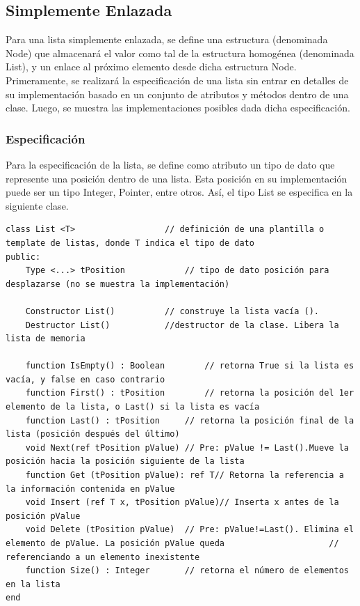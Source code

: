 \subsection{Simplemente Enlazada}
Para una lista simplemente enlazada, se define una estructura (denominada Node) que almacenará el valor como tal de la estructura homogénea (denominada List), y un enlace al próximo elemento desde dicha estructura Node. Primeramente, se realizará la especificación de una lista sin entrar en detalles de su implementación basado en un conjunto de atributos y métodos dentro de una clase. Luego, se muestra las implementaciones posibles dada dicha especificación.

\subsubsection{Especificación}

Para la especificación de la lista, se define como atributo un tipo de dato que represente una posición dentro de una lista. Esta posición en su implementación puede ser un tipo Integer, Pointer, entre otros. Así, el tipo List se especifica en la siguiente clase.

\begin{lstlisting}[upquote=true, language=pseudo]
class List <T>					// definición de una plantilla o template de listas, donde T indica el tipo de dato
public:
    Type <...> tPosition			// tipo de dato posición para desplazarse (no se muestra la implementación)

    Constructor List()			// construye la lista vacía ().
    Destructor List()			//destructor de la clase. Libera la lista de memoria

    function IsEmpty() : Boolean		// retorna True si la lista es vacía, y false en caso contrario
    function First() : tPosition		// retorna la posición del 1er elemento de la lista, o Last() si la lista es vacía
    function Last() : tPosition		// retorna la posición final de la lista (posición después del último)
    void Next(ref tPosition pValue)	// Pre: pValue != Last().Mueve la posición hacia la posición siguiente de la lista
    function Get (tPosition pValue): ref T// Retorna la referencia a la información contenida en pValue
    void Insert (ref T x, tPosition pValue)// Inserta x antes de la posición pValue
    void Delete (tPosition pValue)	// Pre: pValue!=Last(). Elimina el elemento de pValue. La posición pValue queda						// referenciando a un elemento inexistente
    function Size() : Integer		// retorna el número de elementos en la lista
end
\end{lstlisting}

